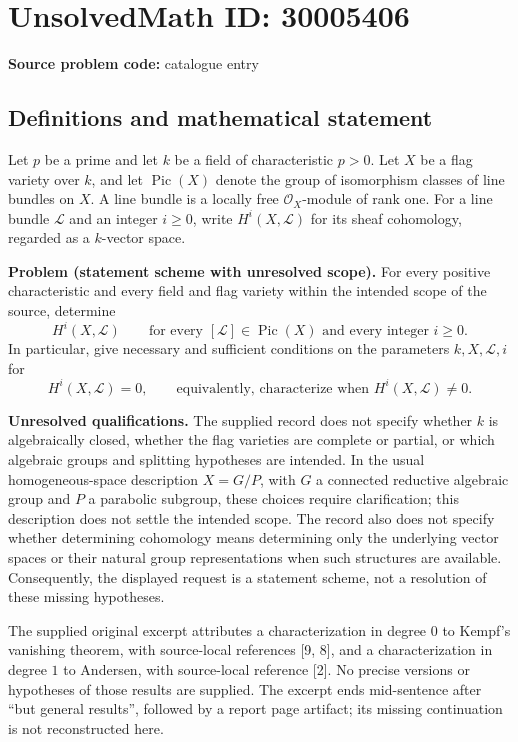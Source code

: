 \documentclass[11pt]{article}
\begin{document}
\section*{UnsolvedMath ID: 30005406}
\textbf{Source problem code:} catalogue entry
\subsection{Definitions and mathematical statement}
Let \(p\) be a prime and let \(k\) be a field of characteristic \(p>0\). Let \(X\) be a flag variety over \(k\), and let \(\operatorname{Pic}(X)\) denote the group of isomorphism classes of line bundles on \(X\). A line bundle is a locally free \(\mathcal O_X\)-module of rank one. For a line bundle \(\mathcal L\) and an integer \(i\geq 0\), write \(H^i(X,\mathcal L)\) for its sheaf cohomology, regarded as a \(k\)-vector space.

\textbf{Problem (statement scheme with unresolved scope).} For every positive characteristic and every field and flag variety within the intended scope of the source, determine
\[
H^i(X,\mathcal L)
\qquad
\text{for every }[\mathcal L]\in\operatorname{Pic}(X)
\text{ and every integer }i\geq 0.
\]
In particular, give necessary and sufficient conditions on the parameters \(k,X,\mathcal L,i\) for
\[
H^i(X,\mathcal L)=0,
\qquad\text{equivalently, characterize when }H^i(X,\mathcal L)\neq 0.
\]

\textbf{Unresolved qualifications.} The supplied record does not specify whether \(k\) is algebraically closed, whether the flag varieties are complete or partial, or which algebraic groups and splitting hypotheses are intended. In the usual homogeneous-space description \(X=G/P\), with \(G\) a connected reductive algebraic group and \(P\) a parabolic subgroup, these choices require clarification; this description does not settle the intended scope. The record also does not specify whether determining cohomology means determining only the underlying vector spaces or their natural group representations when such structures are available. Consequently, the displayed request is a statement scheme, not a resolution of these missing hypotheses.

The supplied original excerpt attributes a characterization in degree \(0\) to Kempf's vanishing theorem, with source-local references [9, 8], and a characterization in degree \(1\) to Andersen, with source-local reference [2]. No precise versions or hypotheses of those results are supplied. The excerpt ends mid-sentence after ``but general results'', followed by a report page artifact; its missing continuation is not reconstructed here.
\end{document}
